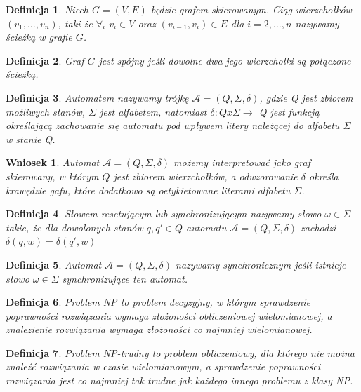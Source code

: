 \documentclass[12pt,a4paper]{article}
\newtheorem{df}{Definicja}[section]
\newtheorem{wn}{Wniosek}[section]
\begin{document}
\begin{df} 
Niech $G=(V,E)$ b\k{e}dzie grafem skierowanym. Ci\k{a}g wierzcho{\l}k\'ow $(v_{1}, \ldots, v_{n})$, taki \.ze $\forall_{i}$ $v_{i}\in V$ oraz  $(v_{i-1}, v_{i}) \in E$ dla $i=2, \ldots, n$ nazywamy \'scie\.zk\k{a} w grafie $G$.
\end{df} 
\begin{df} 
Graf $G$ jest sp\'ojny je\'sli dowolne dwa jego wierzcho{\l}ki s\k{a} po{\l}\k{a}czone \'scie\.zk\k{a}.
\end{df}
\begin{df} 
Automatem nazywamy tr\'{o}jk\k{e} $\mathscr{A}=(Q, \Sigma, \delta)$, gdzie Q jest zbiorem mo\.{z}liwych stan\'{o}w, $\Sigma$ jest alfabetem, natomiast $\delta:Q x \Sigma \rightarrow$ Q jest funkcj\k{a} okre\'{s}laj\k{a}c\k{a} zachowanie si\k{e} automatu pod wp{\l}ywem litery nale\.{z}\k{a}cej do alfabetu $\Sigma$ w stanie Q.
\end{df}
\begin{wn}
Automat $\mathscr{A}=(Q, \Sigma, \delta)$ mo\.zemy interpretowa\'c jako graf skierowany, w kt\'orym $Q$ jest zbiorem wierzcho{\l}k\'ow, a odwzorowanie $\delta$ okre\'sla kraw\k{e}dzie gafu, kt\'ore dodatkowo s\k{a} oetykietowane literami alfabetu $\Sigma$.
\end{wn}
\begin{df} 
S{\l}owem resetuj\k{a}cym lub synchronizuj\k{a}cym nazywamy s{\l}owo $\omega \in \Sigma$ takie, \.{z}e dla dowolonych stan\'{o}w $q, q' \in Q$ automatu $\mathscr{A}=(Q, \Sigma, \delta)$ zachodzi $\delta(q,w)=\delta(q',w)$
\end{df}
\begin{df} 
Automat $\mathscr{A}=(Q, \Sigma, \delta)$ nazywamy synchronicznym je\'{s}li istnieje s{\l}owo $\omega \in \Sigma$ synchronizuj\k{a}ce ten automat.
\end{df}
\begin{df}
Problem NP to problem decyzyjny, w kt\'orym sprawdzenie poprawno\'sci rozwi\k{a}zania wymaga z{\l}o\.zono\'sci obliczeniowej wielomianowej, a znalezienie rozwi\k{a}zania wymaga z{\l}o\.zono\'sci co najmniej wielomianowej.
\end{df}
\begin{df}
Problem NP-trudny to problem obliczeniowy, dla kt\'orego nie mo\.zna znale\'z\'c rozwi\k{a}zania w czasie wielomianowym, a sprawdzenie poprawno\'sci rozwi\k{a}zania jest co najmniej tak trudne jak ka\.zdego innego problemu z klasy NP.
\end{df}
\end{document}
